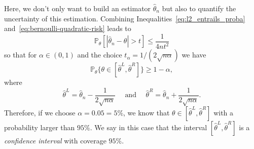 \documentclass[
	fontsize=11pt, %
	twoside=false, %
	numbers=noenddot, %
]{kaobook}
\renewcommand{\P}{\mathbb P}
\newcommand{\wh}{\widehat}
\begin{document}
Here, we don't only want to build an estimator $\wh \theta_n$ but also to quantify the uncertainty of this estimation.
Combining Inequalities~\eqref{eq:l2_entrails_proba} and~\eqref{eq:bernoulli-quadratic-risk} leads to
\begin{equation*}
	\P_\theta[ |\wh \theta_n - \theta| > t] \leq \frac{1}{4 n t^2}
\end{equation*}
so that for $\alpha \in (0, 1)$ and the choice $t_\alpha = 1 / (2 \sqrt{n \alpha})$ we have 
\begin{equation*}
	\P_\theta \{ \theta \in [ \wh \theta^L, \wh \theta^R ] \} \geq 1 - \alpha,
\end{equation*}
where
\begin{equation*}
	\wh \theta^L =  \wh \theta_n - \frac{1}{2 \sqrt{n \alpha}} \quad \text{ and } \quad \wh \theta^R =  \wh \theta_n + \frac{1}{2 \sqrt{n \alpha}}.
\end{equation*}
Therefore, if we choose $\alpha = 0.05 = 5\%$, we know that $\theta \in [\wh \theta^L, \wh \theta^R]$ with a probability larger than $95\%$.
We say in this case that the interval $[\wh \theta^L, \wh \theta^R]$ is a \emph{confidence interval} with coverage $95\%$.%
\end{document}
